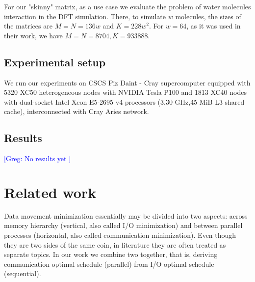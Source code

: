 \documentclass[sigplan,review,anonymous]{acmart}\settopmatter{printfolios=true,printccs=false,printacmref=false}
\newcommand\greg[1]{\textcolor{blue}{[Greg: #1]}}
\begin{document}
For our "skinny" matrix, as a use case we evaluate the problem of water 
molecules interaction in the DFT
simulation\cite{joost}. There, to simulate $w$ molecules, the sizes of the 
matrices are $M=N=136w$ and $K = 228w^2$. For $w=64$, as it was used in their 
work, we have $M=N=8704, K = 933888$.

\subsection{Experimental setup}
We run our experiments on CSCS Piz Daint - Cray supercomputer equipped with 
5320 XC50 heterogeneous nodes with NVIDIA Tesla P100 and 1813 XC40 nodes with 
dual-socket Intel Xeon E5-2695 v4 processors (3.30 GHz,45 MiB L3 shared cache), 
interconnected with Cray Aries network.

\subsection{Results}
\greg{No results yet
}



\section{Related work}
Data movement minimization essentially may be divided into two aspects: across 
memory hierarchy (vertical, also called I/O minimization) and between parallel 
processes (horizontal, also called communication minimization). Even though 
they are two sides of the same coin, in literature they are often treated as 
separate topics. In our work we combine two together, that is, deriving 
communication optimal schedule (parallel) from I/O optimal schedule 
(sequential).
\end{document}
